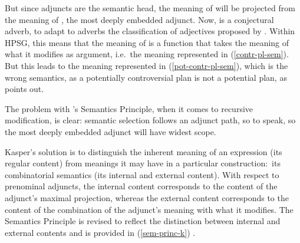 \documentclass[output=paper
 	        ,biblatex
                ,babelshorthands
                ,newtxmath
                ,draftmode
                ,colorlinks, citecolor=brown
]{langscibook}
\begin{document}
\begin{exe}
\ex\label{contr-pl-sem}

\end{exe}

\noindent
But since adjuncts are the semantic head, the meaning of  will be projected from the meaning of , the most deeply embedded adjunct. Now,  is  a conjectural adverb, to adapt to adverbs the classification of adjectives proposed by \citet[125]{KeenanandFaltz1985}. Within HPSG, this means that the meaning of  is a function that takes the meaning of what it modifies as argument, i.e.\ the meaning represented in (\ref{contr-pl-sem}). But this leads to the meaning represented in (\ref{pot-contr-pl-sem}), which is the wrong semantics, as a potentially controversial plan is not a potential plan, as \citet[10--11]{Kasper1997} points out.

\begin{exe}
\ex\label{pot-contr-pl-sem}
\end{exe}

\noindent
The problem with \citeauthor{PollardandSag1994}'s Semantics Principle, when it comes to recursive modification, is clear: semantic selection follows an adjunct path, so to speak, so the most deeply embedded adjunct will have widest scope. 

Kasper's solution is to distinguish the inherent meaning of an expression (its regular content) from meanings it may have in a particular construction:\ its combinatorial semantics (its internal and external content). With respect to prenominal adjuncts, the internal content corresponds to the content of the adjunct's maximal projection, whereas the external content corresponds to the content of the combination of the adjunct's meaning with what it modifies. The Semantics Principle is revised to reflect the distinction between internal and external contents and is provided in (\ref{sem-princ-k}) \citep[19]{Kasper1997}.
\end{document}
